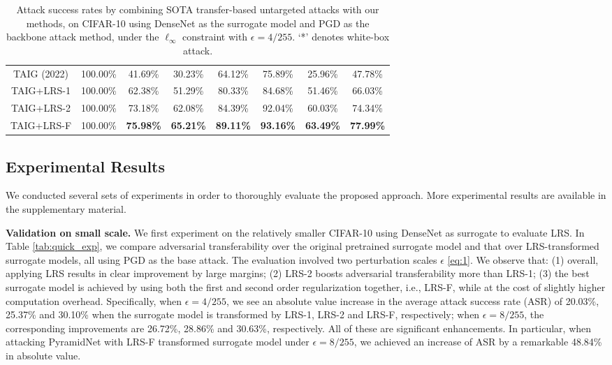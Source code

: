 \documentclass[letterpaper]{article} %
\theoremstyle{plain}
\theoremstyle{definition}
\begin{document}
\begin{table}[ht!]
\begin{center}
{\begin{tabular}{c|c|cccccc}
TAIG (2022)     & {100.00\%} & 41.69\% & 30.23\% &64.12\% & 75.89\% & 25.96\%    & {47.78\%} \\
TAIG+LRS-1     & {100.00\%} & 62.38\% & 51.29\% &80.33\% & 84.68\% & 51.46\%    & {66.03\%} \\
TAIG+LRS-2     & {100.00\%} & 73.18\% & 62.08\% &84.39\% & 92.04\% & 60.03\%    & {74.34\%} \\
TAIG+LRS-F     & {100.00\%} & \textbf{75.98\%} & \textbf{65.21\%} &\textbf{89.11\%} & \textbf{93.16\%} & \textbf{63.49\%}    & \textbf{77.99\%} \\
\bottomrule
\end{tabular}}
\caption{Attack success rates by combining SOTA transfer-based untargeted attacks with our methods, on CIFAR-10 using DenseNet as the surrogate model and PGD as the backbone attack method, under the $\ell_\infty$ constraint with $\epsilon=4/255$. `*' denotes white-box attack.}
\vspace{-5mm}
\label{tab:combine_cifar10}
\end{center} 
\end{table}


\subsection{Experimental Results}
We conducted several sets of experiments in order to thoroughly evaluate the proposed approach. More experimental results are available in the supplementary material.

\textbf{Validation on small scale.} 
We first experiment on the relatively smaller CIFAR-10 using DenseNet as surrogate to evaluate LRS. %
In Table \ref{tab:quick_exp}, we compare adversarial transferability over the original pretrained surrogate model and that over LRS-transformed surrogate models, all using PGD as the base attack. The evaluation involved two perturbation scales $\epsilon$ \eqref{eq:1}. We observe that: (1) overall, applying LRS results in clear improvement by large margins; (2) LRS-2 boosts adversarial transferability more than LRS-1; (3) the best surrogate model is achieved by using both the first and second order regularization together, i.e., LRS-F, while at the cost of slightly higher computation overhead. Specifically, when $\epsilon=4/255$, we see an absolute value increase in the average attack success rate (ASR) of 20.03\%, 25.37\% and 30.10\% when the surrogate model is transformed by LRS-1, LRS-2 and LRS-F, respectively; when $\epsilon=8/255$, the corresponding improvements are 26.72\%, 28.86\% and 30.63\%, respectively. All of these are significant enhancements. In particular, when attacking PyramidNet with LRS-F transformed surrogate model under $\epsilon=8/255$, we achieved an increase of ASR by a remarkable 48.84\% in absolute value.
\end{document}
